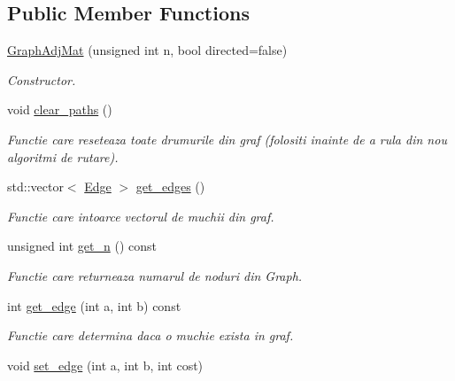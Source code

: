 \subsection*{Public Member Functions}
\begin{DoxyCompactItemize}
\item 
\hyperlink{classGraphAdjMat_a31e0dcb775dbff2143bb23362570f06a}{GraphAdjMat} (unsigned int n, bool directed=false)
\begin{DoxyCompactList}\small\item\em Constructor. \end{DoxyCompactList}\item 
\hypertarget{classGraphAdjMat_a14096e1110de31ed885a5db3aefc0352}{
void \hyperlink{classGraphAdjMat_a14096e1110de31ed885a5db3aefc0352}{clear\_\-paths} ()}
\label{classGraphAdjMat_a14096e1110de31ed885a5db3aefc0352}

\begin{DoxyCompactList}\small\item\em Functie care reseteaza toate drumurile din graf (folositi inainte de a rula din nou algoritmi de rutare). \end{DoxyCompactList}\item 
std::vector$<$ \hyperlink{structEdge}{Edge} $>$ \hyperlink{classGraphAdjMat_a001e4a1c68a16e97bcd46803d22aa09a}{get\_\-edges} ()
\begin{DoxyCompactList}\small\item\em Functie care intoarce vectorul de muchii din graf. \end{DoxyCompactList}\item 
unsigned int \hyperlink{classGraphAdjMat_a5085b90aa536ef045a93902f18eb8867}{get\_\-n} () const 
\begin{DoxyCompactList}\small\item\em Functie care returneaza numarul de noduri din Graph. \end{DoxyCompactList}\item 
int \hyperlink{classGraphAdjMat_aff425a66e306023d3465336ff9392b27}{get\_\-edge} (int a, int b) const 
\begin{DoxyCompactList}\small\item\em Functie care determina daca o muchie exista in graf. \end{DoxyCompactList}\item 
\hypertarget{classGraphAdjMat_af97e10d2dc5ecbefe2e24aa064e3f9b1}{
void \hyperlink{classGraphAdjMat_af97e10d2dc5ecbefe2e24aa064e3f9b1}{set\_\-edge} (int a, int b, int cost)}
\label{classGraphAdjMat_af97e10d2dc5ecbefe2e24aa064e3f9b1}


\end{DoxyCompactItemize}
